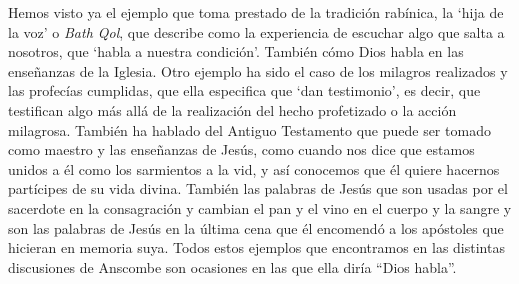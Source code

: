 Hemos visto ya el ejemplo que toma prestado de la tradición rabínica, la `hija de la voz' o \emph{Bath Qol}, que describe como la experiencia de escuchar algo que salta a nosotros, que `habla a nuestra condición'. También cómo Dios habla en las enseñanzas de la Iglesia. Otro ejemplo ha sido el caso de los milagros realizados y las profecías cumplidas, que ella especifica que `dan testimonio', es decir, que testifican algo más allá de la realización del hecho profetizado o la acción milagrosa. También ha hablado del Antiguo Testamento que puede ser tomado como maestro y las enseñanzas de Jesús, como cuando nos dice que estamos unidos a él como los sarmientos a la vid, y así conocemos que él quiere hacernos partícipes de su vida divina. También las palabras de Jesús que son usadas por el sacerdote en la consagración y cambian el pan y el vino en el cuerpo y la sangre y son las palabras de Jesús en la última cena que él encomendó a los apóstoles que hicieran en memoria suya. Todos estos ejemplos que encontramos en las distintas discusiones de Anscombe son ocasiones en las que ella diría ``Dios habla''.

